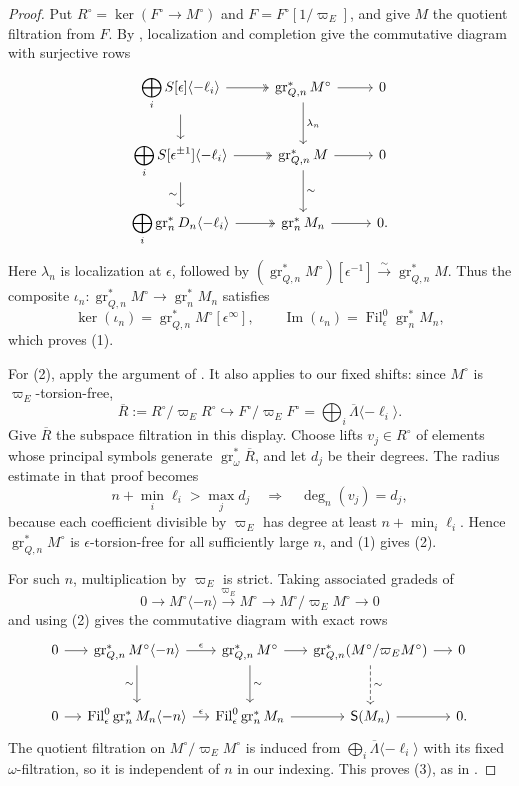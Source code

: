 \documentclass[11pt]{article}
\theoremstyle{definition}
\newcommand{\gr}{\operatorname{gr}}
\newcommand{\Fil}{\operatorname{Fil}}
\newcommand{\im}{\operatorname{Im}}
\begin{document}
\begin{proof}
Put $R^\circ=\ker(F^\circ\to M^\circ)$ and
$F=F^\circ[1/\varpi_E]$, and give $M$ the quotient
filtration from $F$. By \cite[Lemmas~2.1--2.3]{Sorgdrager2026},
localization and completion give the commutative diagram with
surjective rows
\[
\begin{tikzcd}%
 \displaystyle\bigoplus_iS[\epsilon]\langle-\ell_i\rangle
   \arrow[r,two heads]\arrow[d]
 &\gr_{Q,n}^*M^\circ\arrow[r]\arrow[d,"\lambda_n"]&0\\
 \displaystyle\bigoplus_iS[\epsilon^{\pm1}]\langle-\ell_i\rangle
   \arrow[r,two heads]\arrow[d,"\sim"']
 &\gr_{Q,n}^*M\arrow[r]\arrow[d,"\sim"]&0\\
 \displaystyle\bigoplus_i\gr_n^*D_n\langle-\ell_i\rangle
   \arrow[r,two heads]
 &\gr_n^*M_n\arrow[r]&0.
\end{tikzcd}
\]
Here $\lambda_n$ is localization at $\epsilon$, followed by
$(\gr_{Q,n}^*M^\circ)[\epsilon^{-1}]
 \xrightarrow{\sim}\gr_{Q,n}^*M$.
Thus the composite $\iota_n:\gr_{Q,n}^*M^\circ\to\gr_n^*M_n$ satisfies
\[
 \ker(\iota_n)=\gr_{Q,n}^*M^\circ[\epsilon^\infty],\qquad
 \im(\iota_n)=\Fil_\epsilon^0\gr_n^*M_n,
\]
which proves (1).

For (2), apply the argument of
\cite[Proposition~5.1]{Sorgdrager2026}. It also applies to our fixed
shifts: since $M^\circ$ is $\varpi_E$-torsion-free,
\[
 \overline R:=R^\circ/\varpi_ER^\circ
 \hookrightarrow F^\circ/\varpi_EF^\circ
       =\bigoplus_i\overline\Lambda\langle-\ell_i\rangle.
\]
Give $\overline R$ the subspace filtration in this display. Choose
lifts $v_j\in R^\circ$ of elements whose principal symbols generate
$\gr_\omega^*\overline R$, and let $d_j$ be their degrees.
The radius estimate in that proof becomes
\[
 n+\min_i\ell_i>\max_jd_j
 \quad\Longrightarrow\quad \deg_n(v_j)=d_j,
\]
because each coefficient divisible by $\varpi_E$ has degree at least
$n+\min_i\ell_i$. Hence $\gr_{Q,n}^*M^\circ$ is
$\epsilon$-torsion-free for all sufficiently large $n$, and (1) gives (2).

For such $n$, multiplication by $\varpi_E$ is strict. Taking associated
gradeds of
\[
 0\longrightarrow M^\circ\langle-n\rangle
 \xrightarrow{\varpi_E}M^\circ
 \longrightarrow M^\circ/\varpi_EM^\circ\longrightarrow0
\]
and using (2) gives the commutative diagram with exact rows
\[
\begin{tikzcd}[column sep=small,row sep=large]
 0\arrow[r]
 &\gr_{Q,n}^*M^\circ\langle-n\rangle
   \arrow[r,"\epsilon"]\arrow[d,"\sim"']
 &\gr_{Q,n}^*M^\circ\arrow[r]\arrow[d,"\sim"]
 &\gr_{Q,n}^*(M^\circ/\varpi_EM^\circ)
   \arrow[r]\arrow[d,dashed,"\sim"]&0\\
 0\arrow[r]
 &\Fil_\epsilon^0\gr_n^*M_n\langle-n\rangle
   \arrow[r,"\epsilon"]
 &\Fil_\epsilon^0\gr_n^*M_n\arrow[r]
 &\mathsf S(M_n)\arrow[r]&0.
\end{tikzcd}
\]
The quotient filtration on $M^\circ/\varpi_EM^\circ$ is induced from
$\bigoplus_i\overline\Lambda\langle-\ell_i\rangle$ with its fixed
$\omega$-filtration, so it is independent of $n$ in our indexing.
This proves (3), as in \cite[Proposition~2.1 and Lemma~2.4]{Sorgdrager2026}.
\end{proof}
\end{document}
